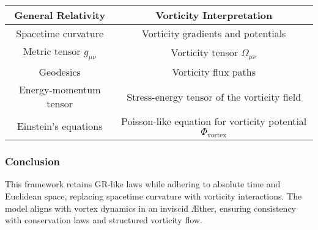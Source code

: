     \begin{center}
        \begin{tabular}{|c|c|}
            \hline
            \textbf{General Relativity} & \textbf{Vorticity Interpretation} \\
            \hline
            Spacetime curvature & Vorticity gradients and potentials \\
            Metric tensor $g_{\mu\nu}$ & Vorticity tensor $\Omega_{\mu\nu}$ \\
            Geodesics & Vorticity flux paths \\
            Energy-momentum tensor & Stress-energy tensor of the vorticity field \\
            Einstein's equations & Poisson-like equation for vorticity potential $\Phi_{\text{vortex}}$ \\
            \hline
        \end{tabular}
    \end{center}

    \subsubsection*{Conclusion}
    This framework retains GR-like laws while adhering to absolute time and Euclidean space, replacing spacetime curvature with vorticity interactions. The model aligns with vortex dynamics in an inviscid Æther, ensuring consistency with conservation laws and structured vorticity flow.
